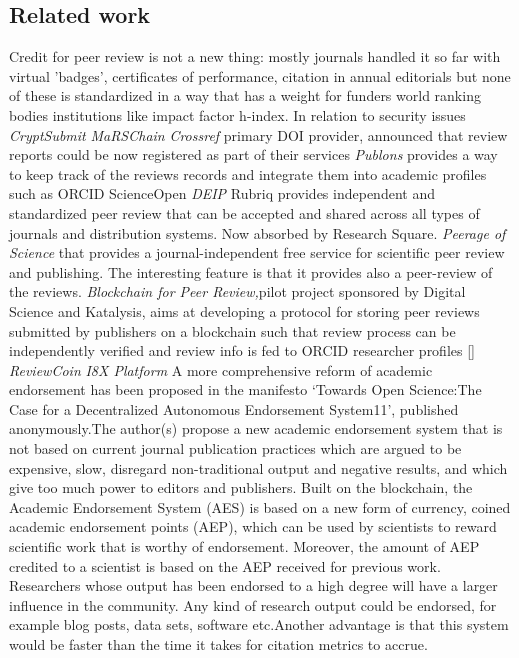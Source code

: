 \documentclass[runningheads]{llncs}
\begin{document}
\subsection{Related work}
Credit for peer review is not a new thing: mostly journals handled it so far with virtual 'badges', certificates of performance, citation in annual editorials but none of these is standardized in a way that has a weight for funders world ranking bodies institutions like impact factor h-index.
In relation to security issues \emph{CryptSubmit} \emph{MaRSChain}
\emph{Crossref} primary DOI provider, announced that review reports could be now registered as part of their services
\emph{Publons} provides a way to keep track of the reviews records and integrate them into academic profiles such as ORCID
ScienceOpen
\emph{DEIP}
Rubriq provides independent and standardized peer review that can be accepted and shared across all types of journals and distribution systems. Now absorbed by Research Square.
\emph{Peerage of Science} that provides a journal-independent free service for scientific peer review and publishing. The interesting feature is that it provides also a peer-review of the reviews.
\emph{Blockchain for Peer Review,}pilot project sponsored by Digital Science and Katalysis, aims at developing a protocol for storing peer reviews submitted by publishers on a blockchain such that review process can be independently verified and review info is fed to ORCID researcher profiles []
\emph{ReviewCoin}
\emph{I8X Platform}
A more comprehensive reform of academic endorsement has been proposed in the manifesto ‘Towards Open Science:The Case for a Decentralized Autonomous Endorsement System11’, published anonymously.The author(s) propose a new academic endorsement system that is not based on current journal publication practices which are argued to be expensive, slow, disregard non-traditional output and negative results, and which give too much power to editors and publishers. Built on the blockchain, the Academic Endorsement System (AES) is based on a new form of currency, coined academic endorsement points (AEP), which can be used by scientists to reward scientific work that is worthy of endorsement. Moreover, the amount of AEP credited to a scientist is based on the AEP received for previous work. Researchers whose output has been endorsed to a high degree will have a larger influence in the community. Any kind of research output could be endorsed, for example blog posts, data sets, software etc.Another advantage is that this system would be faster than the time it takes for citation metrics to accrue.
\end{document}
